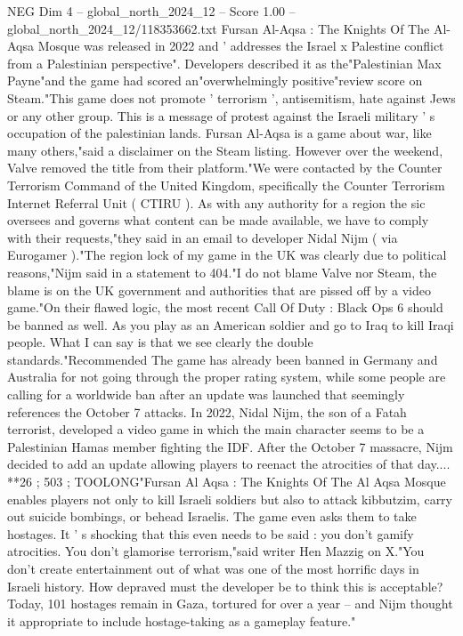 \begin{textsample}{NEG Dim 4 – global\_north\_2024\_12 – Score 1.00 – global\_north\_2024\_12/118353662.txt}  \label{ex:f4_neg_139}
Fursan Al-Aqsa : The Knights Of The Al-Aqsa Mosque was released in 2022 and ' addresses the Israel x Palestine conflict from a Palestinian perspective".
Developers described it as the"Palestinian Max Payne"and the game had scored an"overwhelmingly positive"review score on Steam."This game does not promote ' terrorism ', antisemitism, hate against Jews or any other group.
This is a message of protest against the Israeli military ' s occupation of the palestinian lands.
Fursan Al-Aqsa is a game about war, like many others,"said a disclaimer on the Steam listing.
However over the weekend, Valve removed the title from their platform."We were contacted by the Counter Terrorism Command of the United Kingdom, specifically the Counter Terrorism Internet Referral Unit ( CTIRU ).
As with any authority for a region the sic oversees and governs what content can be made available, we have to comply with their requests,"they said in an email to developer Nidal Nijm ( via Eurogamer )."The region lock of my game in the UK was clearly due to political reasons,"Nijm said in a statement to 404."I do not blame Valve nor Steam, the blame is on the UK government and authorities that are pissed off by a video game."On their flawed logic, the most recent Call Of Duty : Black Ops 6 should be banned as well.
As you play as an American soldier and go to Iraq to kill Iraqi people.
What I can say is that we see clearly the double standards."Recommended The game has already been banned in Germany and Australia for not going through the proper rating system, while some people are calling for a worldwide ban after an update was launched that seemingly references the October 7 attacks.
In 2022, Nidal Nijm, the son of a Fatah terrorist, developed a video game in which the main character seems to be a Palestinian Hamas member fighting the IDF.
After the October 7 massacre, Nijm decided to add an update allowing players to reenact the atrocities of that day.... **26 ; 503 ; TOOLONG"Fursan Al Aqsa : The Knights Of The Al Aqsa Mosque enables players not only to kill Israeli soldiers but also to attack kibbutzim, carry out suicide bombings, or behead Israelis.
The game even asks them to take hostages.
It ' s shocking that this even needs to be said : you don't gamify atrocities.
You don't glamorise terrorism,"said writer Hen Mazzig on X."You don't create entertainment out of what was one of the most horrific days in Israeli history.
How depraved must the developer be to think this is acceptable?
Today, 101 hostages remain in Gaza, tortured for over a year -- and Nijm thought it appropriate to include hostage-taking as a gameplay feature."

\end{textsample}
